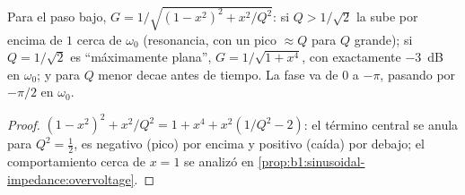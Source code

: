 \begin{proposition}\label{prop:b1:filters-transfer-functions:lowpass2}
Para el paso bajo, $G = 1/\sqrt{(1 - x^2)^2 + x^2/Q^2}$: si
$Q > 1/\sqrt2$ la  sube por encima de $1$ cerca de $\omega_0$
(resonancia, con un pico $\approx Q$ para $Q$ grande); si $Q = 1/\sqrt2$
es ``máximamente plana'', $G = 1/\sqrt{1 + x^4}$, con exactamente
\qty{-3}{dB} en $\omega_0$; y para $Q$ menor decae antes de tiempo. La
fase va de $0$ a $-\pi$, pasando por $-\pi/2$ en $\omega_0$.
\end{proposition}

\begin{proof}
$(1 - x^2)^2 + x^2/Q^2 = 1 + x^4 + x^2(1/Q^2 - 2)$: el término central se
anula para $Q^2 = \tfrac12$, es negativo (pico) por encima y positivo
(caída) por debajo; el comportamiento cerca de $x = 1$ se analizó en
\cref{prop:b1:sinusoidal-impedance:overvoltage}.
\end{proof}

